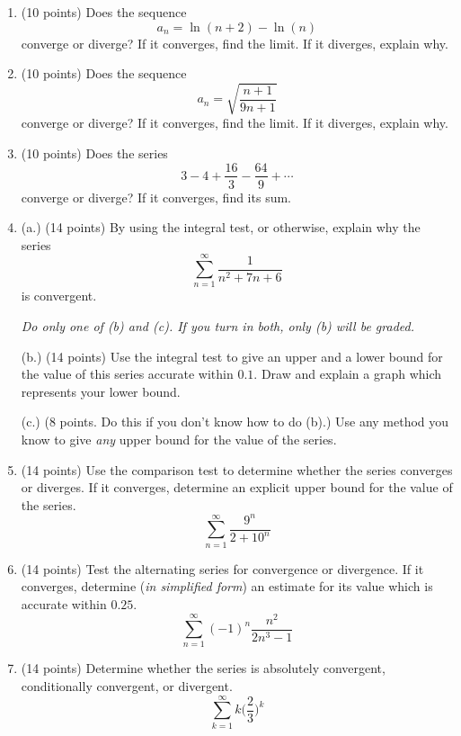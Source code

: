 \documentclass[12pt]{article}
\begin{document}
\begin{enumerate}[(1)]
\item
(10 points) Does the sequence
\[
a_n = \ln(n + 2) - \ln(n)
\]
converge or diverge? If it converges, find the limit. If it diverges, explain why.
\item
(10 points) Does the sequence
\[
a_n = \sqrt{ \frac{ n + 1} {9n + 1} }
\]
converge or diverge? If it converges, find the limit. If it diverges, explain why.

\item
(10 points) Does the series
\[
3 - 4 + \frac{16}{3} - \frac{64}{9} + \cdots
\]
converge or diverge? If it converges, find its sum.
\item
(a.) (14 points) 
By using the integral test, or otherwise, explain why the series
\[
\sum_{n = 1}^{\infty} \frac{1}{n^2 + 7n + 6}
\]
is convergent.

{\itshape Do only one of (b) and (c). If you turn in both, only (b) will be graded.}

(b.) (14 points)
Use the integral test to 
give an upper and a lower bound for the value of this series accurate within $0.1$.
Draw and explain a graph which represents your lower bound.

(c.) (8 points. Do this if you don't know how to do (b).)
Use any method you know to give {\itshape any}
upper bound for the value of the series.

\item
(14 points) Use the comparison test to 
determine whether the series converges or diverges. 
If it converges, determine an explicit upper bound for the value of the series.
\[
\sum_{n = 1}^{\infty} \frac{9^n}{2 + 10^n}
\]
\item
(14 points) 
Test the alternating series for convergence or divergence. If it converges, determine
({\itshape in simplified form})
an estimate for its value which is accurate within $0.25$.
\[
\sum_{n = 1}^{\infty} (-1)^n \frac{n^2}{2n^3 - 1}
\]
\item
(14 points) 
Determine whether the series is absolutely convergent, conditionally convergent, or divergent.
\[
\sum_{k = 1}^{\infty} k \bigg( \frac{2}{3} \bigg)^k
\]


\end{enumerate}
\end{document}
